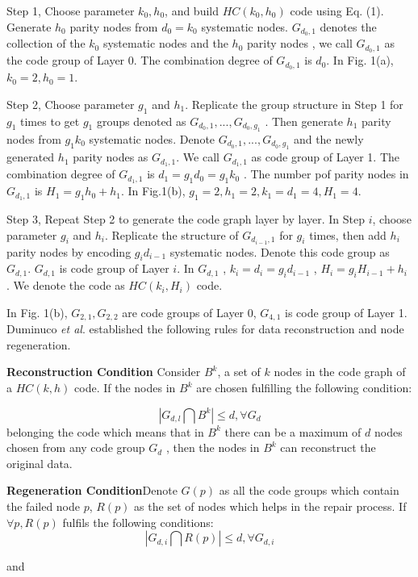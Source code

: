 \documentclass{article} %
\begin{document}
Step 1, Choose parameter  $k_0, h_0$,  and build $HC(k_0 , h_0)$ code using Eq. (1). Generate $h_0$  parity nodes from $d_0 = k_0$  systematic nodes. $G_{d_0, 1}$  denotes the collection of the $k_0$ systematic nodes and the $h_0$ parity nodes , we call $G_{d_0, 1}$  as the code group of Layer 0. The combination degree of $G_{d_0, 1}$  is $d_0$. In Fig. 1(a), $k_0 = 2, h_0 = 1$.

Step 2, Choose parameter $g_1$ and $h_1$. Replicate the group structure in Step 1 for $g_1$  times to get  $g_1$ groups denoted as $G_{d_0, 1}, ..., G_{d_0, g_1}$ . Then generate $h_1$ parity nodes from $g_1k_0$  systematic nodes. Denote $G_{d_0, 1}, ..., G_{d_0, g_1}$ and the newly generated $h_1$  parity nodes as $G_{d_1, 1}$. We call $G_{d_1, 1}$  as code group of Layer 1. The combination degree of $G_{d_1, 1}$  is $d_1 = g_1d_0 = g_1k_0$ . The number pof parity nodes in $G_{d_1, 1}$ is $H_1 = g_1h_0 + h_1$. In Fig.1(b), $g_1 = 2, h_1 = 2, k_1 = d_1 = 4, H_1 = 4$.

	Step 3, Repeat Step 2 to generate the code graph layer by layer. In Step $i$, choose parameter $g_i$ and $h_i$. Replicate the structure of $G_{d_{i-1}, 1}$  for $g_i$  times, then add $h_i$  parity nodes by encoding $g_id_{i-1}$  systematic nodes. Denote this code group as $G_{d, 1}$. $G_{d, 1}$ is code group of Layer $i$. In $G_{d, 1}$ , $k_i = d_i = g_id_{i- 1}$  , $H_i = g_iH_{i - 1} + h_i$ . We denote the code as $HC(k_i, H_i)$ code.

In Fig. 1(b), $G_{2, 1}, G_{2, 2}$  are code groups of Layer 0, $G_{4, 1}$ is code group of Layer 1. Duminuco \emph{et al}. established the following rules for data reconstruction and node regeneration.

\textbf{Reconstruction Condition} Consider $B^k$, a set of $k$ nodes in the code graph of a $HC(k, h)$ code. If the nodes in $B^k$ are chosen fulfilling the following condition:

$$|G_{d, l} \bigcap B^k| \le d, \forall G_d$$
belonging the code which means that in $B^k$  there can be a maximum of $d$ nodes chosen from any code group $G_d$ , then the nodes in $B^k$ can reconstruct the original data.

\textbf{Regeneration Condition}Denote $G(p)$ as all the code groups which contain the failed node $p$, $R(p)$ as the set of nodes which helps in the repair process. If $\forall p, R(p)$ fulfils the following conditions:
$$|G_{d, i} \bigcap R(p)| \le d, \forall G_{d, i}$$

and 
\end{document}
